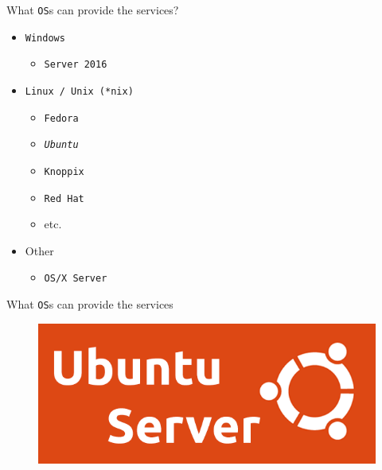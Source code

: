 \documentclass[aspectratio=169]{beamer}
\begin{document}
\begin{frame}{What \texttt{OS}s can provide the services?}
  \begin{itemize}
    \item \texttt{Windows}
      \begin{itemize}
        \item \texttt{Server 2016}
      \end{itemize}
    \item \texttt{Linux / Unix (*nix)}
      \begin{itemize}
        \item \texttt{Fedora}
        \item \textit{\texttt{Ubuntu}}
        \item \texttt{Knoppix}
        \item \texttt{Red Hat}
        \item etc.
      \end{itemize}
    \item Other
      \begin{itemize}
        \item \texttt{OS/X Server}
      \end{itemize}
  \end{itemize}
\end{frame}

\begin{frame}{What \texttt{OS}s can provide the services}
  \begin{figure}
    \begin{center}
      \includegraphics[width=\linewidth]{UbuntuLogo.png}
    \end{center}
  \end{figure}
\end{frame}
\end{document}
